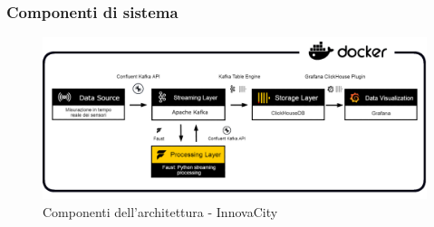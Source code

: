 \subsubsection{Componenti di sistema}
\begin{figure}[H]
    \centering
    \includegraphics[width=1\textwidth]{../Images/SpecificaTecnica/Architettura_PB_microservices2.png}
    \caption{Componenti dell'architettura - InnovaCity}
    \label{fig: fdf}
\end{figure}

